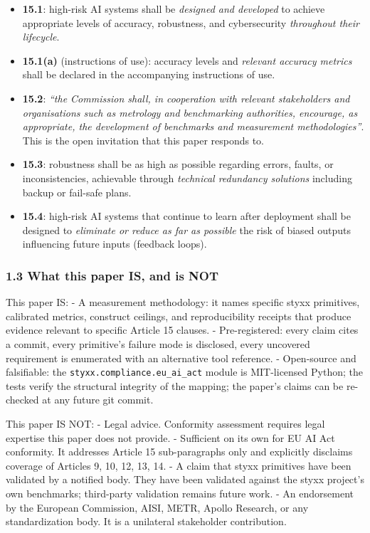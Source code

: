 \documentclass[
]{article}
\providecommand{\tightlist}{%
  \setlength{\itemsep}{0pt}\setlength{\parskip}{0pt}}
\begin{document}
\begin{itemize}
\tightlist
\item
  \textbf{15.1}: high-risk AI systems shall be \emph{designed and
  developed} to achieve appropriate levels of accuracy, robustness, and
  cybersecurity \emph{throughout their lifecycle}.
\item
  \textbf{15.1(a)} (instructions of use): accuracy levels and
  \emph{relevant accuracy metrics} shall be declared in the accompanying
  instructions of use.
\item
  \textbf{15.2}: \emph{``the Commission shall, in cooperation with
  relevant stakeholders and organisations such as metrology and
  benchmarking authorities, encourage, as appropriate, the development
  of benchmarks and measurement methodologies''}. This is the open
  invitation that this paper responds to.
\item
  \textbf{15.3}: robustness shall be as high as possible regarding
  errors, faults, or inconsistencies, achievable through \emph{technical
  redundancy solutions} including backup or fail-safe plans.
\item
  \textbf{15.4}: high-risk AI systems that continue to learn after
  deployment shall be designed to \emph{eliminate or reduce as far as
  possible} the risk of biased outputs influencing future inputs
  (feedback loops).
\end{itemize}

\subsubsection{1.3 What this paper IS, and is
NOT}\label{what-this-paper-is-and-is-not}

This paper IS: - A measurement methodology: it names specific styxx
primitives, calibrated metrics, construct ceilings, and reproducibility
receipts that produce evidence relevant to specific Article 15 clauses.
- Pre-registered: every claim cites a commit, every primitive's failure
mode is disclosed, every uncovered requirement is enumerated with an
alternative tool reference. - Open-source and falsifiable: the
\texttt{styxx.compliance.eu\_ai\_act} module is MIT-licensed Python; the
tests verify the structural integrity of the mapping; the paper's claims
can be re-checked at any future git commit.

This paper IS NOT: - Legal advice. Conformity assessment requires legal
expertise this paper does not provide. - Sufficient on its own for EU AI
Act conformity. It addresses Article 15 sub-paragraphs only and
explicitly disclaims coverage of Articles 9, 10, 12, 13, 14. - A claim
that styxx primitives have been validated by a notified body. They have
been validated against the styxx project's own benchmarks; third-party
validation remains future work. - An endorsement by the European
Commission, AISI, METR, Apollo Research, or any standardization body. It
is a unilateral stakeholder contribution.
\end{document}
